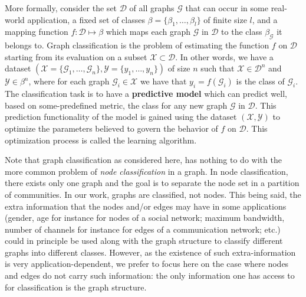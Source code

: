 More formally, consider the set $\mathcal{D}$ of all graphs $\mathcal{G}$ that can occur in some real-world application, a fixed set of classes $\beta=\{\beta _1,\ldots,\beta _l\}$ of finite size $l$, and a mapping function $f:\mathcal{D}\mapsto\beta$ which maps each graph $\mathcal{G}$ in $\mathcal{D}$ to the class $\beta_\mathcal{G}$ it belongs to. Graph classification is the problem of estimating the function $f$ on $\mathcal{D}$ starting from its evaluation on a subset $\mathcal{X}\subset \mathcal{D}$. In other words, we have a dataset $(\mathcal{X}=\{\mathcal{G}_1,\ldots,\mathcal{G}_n\}, \mathcal{Y}=\{y_1,\ldots,y_n\})$ of size $n$ such that $\mathcal{X}\in \mathcal{D}^n$ and $\mathcal{Y}\in\beta^n$, where for each graph $\mathcal{G}_i\in \mathcal{X}$ we have that $y_i=f(\mathcal{G}_i)$ is the class of $\mathcal{G}_i$. The classification task is to have a \textbf{predictive model} which can predict well, based on some-predefined metric,  the class for any new graph $\mathcal{G}$ in $\mathcal{D}$. This prediction functionality of the model is gained using the dataset $(\mathcal{X}, \mathcal{Y})$ to optimize the parameters believed to govern the behavior of $f$ on $\mathcal{D}$. This optimization process is called the learning algorithm.

Note that graph classification as considered here, has nothing to do with the more common problem of \emph{node classification} in a graph. In node classification,  there exists only one graph and the goal is to separate the node set in a partition of communities. In our work, graphs are classified, not nodes. This being said, the extra information that the nodes and/or edges may have in some applications (gender, age for instance for nodes of a social network; maximum bandwidth, number of channels for instance for edges of a communication network; etc.) could in principle be used along with the graph structure to classify different graphs into different classes. However, as the existence of such extra-information is very application-dependent, we prefer to focus here on the case where nodes and edges do not carry such information: the only information one has access to for classification is the graph structure.

